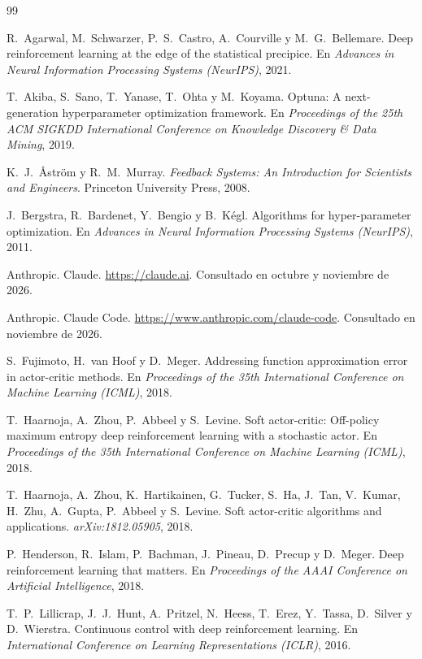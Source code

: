 \documentclass[11pt,a4paper]{article}
\begin{document}
\begin{thebibliography}{99}

 R.~Agarwal, M.~Schwarzer, P.~S.~Castro, A.~Courville y M.~G.~Bellemare. Deep reinforcement learning at the edge of the statistical precipice. En \emph{Advances in Neural Information Processing Systems (NeurIPS)}, 2021.

 T.~Akiba, S.~Sano, T.~Yanase, T.~Ohta y M.~Koyama. Optuna: A next-generation hyperparameter optimization framework. En \emph{Proceedings of the 25th ACM SIGKDD International Conference on Knowledge Discovery \& Data Mining}, 2019.

 K.~J.~Åström y R.~M.~Murray. \emph{Feedback Systems: An Introduction for Scientists and Engineers}. Princeton University Press, 2008.

 J.~Bergstra, R.~Bardenet, Y.~Bengio y B.~Kégl. Algorithms for hyper-parameter optimization. En \emph{Advances in Neural Information Processing Systems (NeurIPS)}, 2011.

 Anthropic. Claude. \url{https://claude.ai}. Consultado en octubre y noviembre de 2026.

 Anthropic. Claude Code. \url{https://www.anthropic.com/claude-code}. Consultado en noviembre de 2026.

 S.~Fujimoto, H.~van Hoof y D.~Meger. Addressing function approximation error in actor-critic methods. En \emph{Proceedings of the 35th International Conference on Machine Learning (ICML)}, 2018.

 T.~Haarnoja, A.~Zhou, P.~Abbeel y S.~Levine. Soft actor-critic: Off-policy maximum entropy deep reinforcement learning with a stochastic actor. En \emph{Proceedings of the 35th International Conference on Machine Learning (ICML)}, 2018.

 T.~Haarnoja, A.~Zhou, K.~Hartikainen, G.~Tucker, S.~Ha, J.~Tan, V.~Kumar, H.~Zhu, A.~Gupta, P.~Abbeel y S.~Levine. Soft actor-critic algorithms and applications. \emph{arXiv:1812.05905}, 2018.

 P.~Henderson, R.~Islam, P.~Bachman, J.~Pineau, D.~Precup y D.~Meger. Deep reinforcement learning that matters. En \emph{Proceedings of the AAAI Conference on Artificial Intelligence}, 2018.

 T.~P.~Lillicrap, J.~J.~Hunt, A.~Pritzel, N.~Heess, T.~Erez, Y.~Tassa, D.~Silver y D.~Wierstra. Continuous control with deep reinforcement learning. En \emph{International Conference on Learning Representations (ICLR)}, 2016.


\end{thebibliography}
\end{document}
